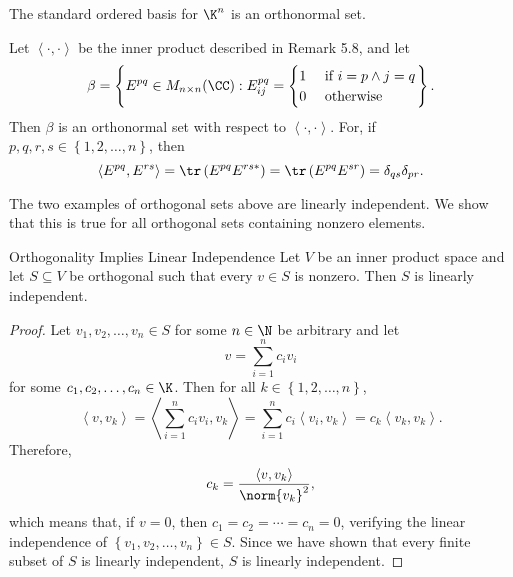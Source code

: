 \documentclass[linearalgebraII]{subfiles}
\begin{document}
    \begin{example}
        The standard ordered basis for $\K^n$ is an orthonormal set.
    \end{example}

    \begin{example}
        Let $\left\langle \cdot, \cdot\right\rangle$ be the inner product described in Remark 5.8, and let
        \begin{equation*}
            \beta = \left\lbrace E^{pq}\in M_{n\times n}(\CC): E^{pq}_{ij} = \begin{cases} 1 & \text{ if } i=p\land j=q \\ 0 & \text{ otherwise }\end{cases}  \right\rbrace .
        \end{equation*}
        Then $\beta$ is an orthonormal set with respect to $\left\langle \cdot, \cdot\right\rangle$. For, if $p,q,r,s\in\left\lbrace 1,2,\ldots,n \right\rbrace$, then
        \begin{equation*}
            \left\langle E^{pq}, E^{rs}\right\rangle = \tr\left( E^{pq}E^{rs*} \right) = \tr\left( E^{pq}E^{sr} \right) = \delta_{qs}\delta_{pr}.
        \end{equation*}
    \end{example}

    \begin{remark}
        The two examples of orthogonal sets above are linearly independent. We show that this is true for all orthogonal sets containing nonzero elements.
    \end{remark}

    \begin{theorem}{Orthogonality Implies Linear Independence}
        Let $V$ be an inner product space and let $S\subseteq V$ be orthogonal such that every $v\in S$ is nonzero. Then $S$ is linearly independent.
    \end{theorem}

    \begin{proof}
        Let $v_1,v_2,\ldots,v_n\in S$ for some $n\in\N$ be arbitrary and let
        \begin{equation*}
            v = \sum^{n}_{i=1} c_iv_i
        \end{equation*}
        for some $c_1,c_2,\ldots,c_n\in\K$. Then for all $k\in\left\lbrace 1,2,\ldots,n \right\rbrace$,
        \begin{equation*}
            \left\langle v, v_k\right\rangle = \left\langle \sum^{n}_{i=1} c_iv_i, v_k\right\rangle = \sum^{n}_{i=1} c_i\left\langle v_i,v_k \right\rangle = c_k\left\langle v_k, v_k\right\rangle.
        \end{equation*}
        Therefore,
        \begin{equation*}
            c_k = \frac{\left\langle v, v_k\right\rangle }{\norm{v_k}^2},
        \end{equation*}
        which means that, if $v=0$, then $c_1=c_2=\cdots=c_n=0$, verifying the linear independence of $\left\lbrace v_1,v_2,\ldots,v_n \right\rbrace \in S$. Since we have shown that every finite subset of $S$ is linearly independent, $S$ is linearly independent.
    \end{proof}
\end{document}

